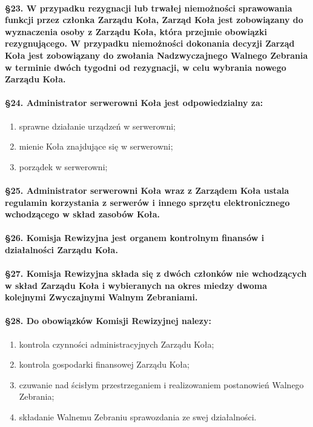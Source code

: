 \documentclass{article}
\begin{document}
		\paragraph{\S 23.  W przypadku rezygnacji lub trwałej niemożności sprawowania funkcji przez członka Zarządu
                           Koła, Zarząd Koła jest zobowiązany do wyznaczenia osoby z Zarządu Koła, która przejmie
                           obowiązki rezygnującego. W przypadku niemożności dokonania decyzji Zarząd Koła jest
                           zobowiązany do zwołania Nadzwyczajnego Walnego Zebrania w terminie dwóch tygodni od
                           rezygnacji, w celu wybrania nowego Zarządu Koła.
                }
		\paragraph{\S 24. Administrator serwerowni Koła jest odpowiedzialny za:}
		\begin{enumerate}
			\item sprawne działanie urządzeń w serwerowni;
			\item mienie Koła znajdujące się w serwerowni;
			\item porządek w serwerowni;
		\end{enumerate}
		\paragraph{\S 25. Administrator serwerowni Koła wraz z Zarządem Koła ustala regulamin korzystania z serwerów i innego sprzętu elektronicznego
                           wchodzącego w skład zasobów Koła.}
		\paragraph{\S 26. Komisja Rewizyjna jest organem kontrolnym finansów i działalności Zarządu Koła.}
		\paragraph{\S 27. Komisja Rewizyjna składa się z dwóch członków nie wchodzących w skład Zarządu Koła i wybieranych na okres miedzy dwoma kolejnymi
                           Zwyczajnymi Walnym Zebraniami.}
		\paragraph{\S 28. Do obowiązków Komisji Rewizyjnej nalezy:}
		\begin{enumerate}
			\item kontrola czynności administracyjnych Zarządu Koła;
			\item kontrola gospodarki finansowej Zarządu Koła;
			\item czuwanie nad ścisłym przestrzeganiem i realizowaniem postanowień Walnego Zebrania;
			\item składanie Walnemu Zebraniu sprawozdania ze swej działalności.
		\end{enumerate}
\end{document}
